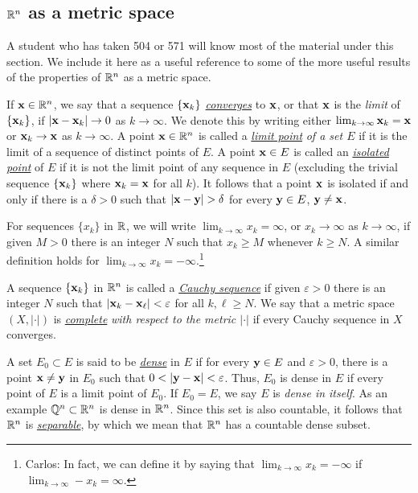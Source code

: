 \subsection{$\mathbb{R}^n$ as a metric space}
A student who has taken 504 or 571 will know most of the material under
this section. We include it here as a useful reference to some of the
more useful results of the properties of $\mathbb{R}^n$ as a metric space.

If $\mathbf{x}\in\mathbb{R}^n$, we say that a sequence $\{\mathbf{x}_k\}$
\href{https://en.wikipedia.org/wiki/Limit_(mathematics)}{\emph{converges}}
to $\mathbf{x}$, or that $\mathbf{x}$ is the \emph{limit} of $\{\mathbf{x}_k\}$, if
$|\mathbf{x}-\mathbf{x}_k|\to 0$ as $k\to\infty$. We denote this by writing either
$\lim_{k\to\infty}\mathbf{x}_k=\mathbf{x}$ or $\mathbf{x}_k\to\mathbf{x}$ as $k\to\infty$. A point
$\mathbf{x}\in\mathbb{R}^n$ is called a
\href{https://en.wikipedia.org/wiki/Limit_point}{\emph{limit point}}
\emph{of a set $E$} if it is the limit of a sequence of distinct points of
$E$. A point $\mathbf{x}\in E$ is called an
\href{https://en.wikipedia.org/wiki/Isolated_point}{\emph{isolated point}}
of $E$ if it is not the limit point of any sequence in $E$ (excluding the
trivial sequence $\{\mathbf{x}_k\}$ where $\mathbf{x}_k=\mathbf{x}$ for all $k$). It follows
that a point $\mathbf{x}$ is isolated if and only if there is a $\delta>0$ such
that $|\bfx-\bfy|>\delta$ for every $\mathbf{y}\in E$, $\mathbf{y}\neq\mathbf{x}$.

For sequences $\{x_k\}$ in $\mathbb{R}$, we will write
$\lim_{k\to\infty}x_k=\infty$, or $x_k\to\infty$ as $k\to\infty$, if given
$M>0$ there is an integer $N$ such that $x_k\geq M$ whenever $k\geq N$. A
similar definition holds for
$\lim_{k\to\infty}x_k=-\infty$.\footnote{Carlos: In fact, we can define it
  by saying that $\lim_{k\to\infty} x_k=-\infty$ if
  $\lim_{k\to\infty}-x_k=\infty$. }

A sequence $\{\mathbf{x}_k\}$ in $\mathbb{R}^n$ is called a
\href{https://en.wikipedia.org/wiki/Cauchy_sequence}{\emph{Cauchy
    sequence}} if given $\varepsilon>0$ there is an integer $N$ such that
$|\mathbf{x}_k-\mathbf{x}_\ell|<\varepsilon$ for all $k,\ell\geq N$. We say that a
metric space $(X,|\cdot|)$ is
\href{https://en.wikipedia.org/wiki/Complete_metric_space}{\emph{complete}}
\emph{with respect to the metric $|\cdot|$} if every Cauchy sequence in $X$
converges.

A set $E_0\subset E$ is said to be
\href{https://en.wikipedia.org/wiki/Dense_set}{\emph{dense}} in $E$ if for
every $\mathbf{y}\in E$ and $\varepsilon>0$, there is a point $\mathbf{x}\neq\mathbf{y}$ in
$E_0$ such that $0<|\bfy-\bfx|<\varepsilon$. Thus, $E_0$ is dense in $E$ if
every point of $E$ is a limit point of $E_0$. If $E_0=E$, we say $E$ is
\emph{dense in itself}. As an example $\mathbb{Q}^n\subset\mathbb{R}^n$ is dense in
$\mathbb{R}^n$. Since this set is also countable, it follows that $\mathbb{R}^n$ is
\href{https://en.wikipedia.org/wiki/Separable_space}{\emph{separable}}, by
which we mean that $\mathbb{R}^n$ has a countable dense subset.

